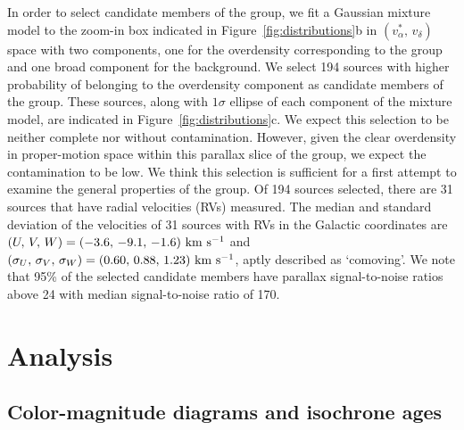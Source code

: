 \documentclass[modern,letterpaper]{aastex61}
\newcommand{\figname}{Figure}
\newcommand{\kms}{\ensuremath{\rm km~s^{-1}}}
\begin{document}
In order to select candidate members of the group,
we fit a Gaussian mixture model to the zoom-in box indicated in
\figname~\ref{fig:distributions}b in $(v_\alpha^*,\,v_\delta)$ space
with two components, one for the overdensity corresponding to the group and
one broad component for the background.
We select 194 sources with higher probability of belonging to the overdensity
component as candidate members of the group.
These sources, along with $1\sigma$ ellipse of each component of the mixture model,
are indicated in \figname~\ref{fig:distributions}c.
We expect this selection to be neither complete nor without contamination.
However, given the clear overdensity in proper-motion space within this parallax slice
of the group, we expect the contamination to be low.
We think this selection is sufficient for a first attempt to examine the general
properties of the group.
Of 194 sources selected, there are 31 sources that have radial velocities (RVs)
measured.
The median and standard deviation of the velocities of 31 sources with RVs
in the Galactic coordinates
are $(U,\,V,\,W) = (-3.6,\,-9.1,\,-1.6)~\kms$ and
$(\sigma_U,\,\sigma_V,\,\sigma_W) = (0.60,\,0.88,\,1.23)~\kms$,
aptly described as `comoving'.
We note that 95\% of the selected candidate members have parallax
signal-to-noise ratios above 24 with median signal-to-noise ratio of 170.


\section{Analysis}
\label{sec:analysis}

\subsection{Color-magnitude diagrams and isochrone ages}
\end{document}
